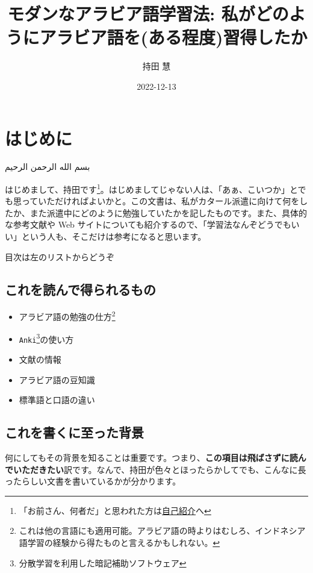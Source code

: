 \documentclass[
]{book}
\title{モダンなアラビア語学習法: 私がどのようにアラビア語を(ある程度)習得したか}
\author{持田 慧}
\date{2022-12-13}
\providecommand{\tightlist}{%
  \setlength{\itemsep}{0pt}\setlength{\parskip}{0pt}}
\begin{document}
\maketitle

{
\setcounter{tocdepth}{1}
\tableofcontents
}
\hypertarget{index}{%
\chapter*{はじめに}\label{index}}

بسم الله الرحمن الرحيم

はじめまして、持田です\footnote{「お前さん、何者だ」と思われた方は\protect\hyperlink{author}{自己紹介}へ}。はじめましてじゃない人は、「あぁ、こいつか」とでも思っていただければよいかと。この文書は、私がカタール派遣に向けて何をしたか、また派遣中にどのように勉強していたかを記したものです。また、具体的な参考文献や Web サイトについても紹介するので、「学習法なんぞどうでもいい」という人も、そこだけは参考になると思います。

目次は左のリストからどうぞ

\hypertarget{get}{%
\section*{これを読んで得られるもの}\label{get}}

\begin{itemize}
\tightlist
\item
  アラビア語の勉強の仕方\footnote{これは他の言語にも適用可能。アラビア語の時よりはむしろ、インドネシア語学習の経験から得たものと言えるかもしれない。}
\item
  \texttt{Anki}\footnote{分散学習を利用した暗記補助ソフトウェア}の使い方
\item
  文献の情報
\item
  アラビア語の豆知識
\item
  標準語と口語の違い
\end{itemize}

\hypertarget{background}{%
\section*{これを書くに至った背景}\label{background}}

何にしてもその背景を知ることは重要です。つまり、\textbf{この項目は飛ばさずに読んでいただきたい}訳です。なんで、持田が色々とほったらかしてでも、こんなに長ったらしい文書を書いているかが分かります。
\end{document}
